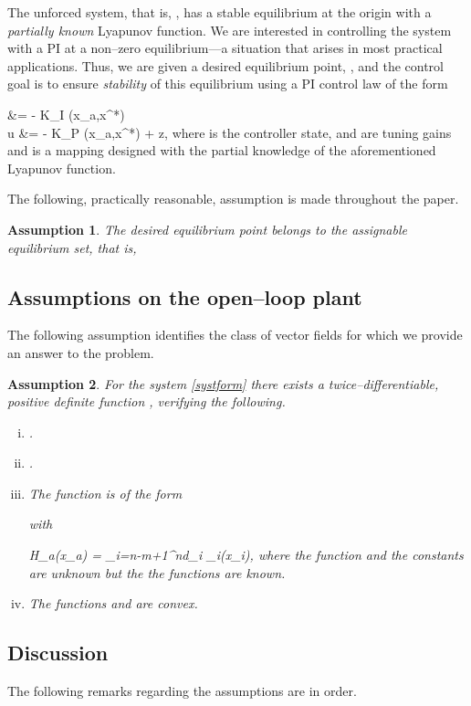 \documentclass[10pt, conference]{ieeeconf}
\newtheorem{assumption}{Assumption}
\def\begequarrs{}
\def\begequ{}
\def\lab{\label}
\begin{document}
The unforced system, that is, ,
has a stable equilibrium at the origin with a {\em partially known} Lyapunov function.  We are interested in controlling the system with a PI at a non--zero equilibrium---a situation that arises in most practical applications.
Thus, we are given a desired equilibrium point, , and the control goal is to ensure {\em stability} of this equilibrium using a PI control law of the form
\begequarrs
{} &= - K_I \psi(x_a,x^*)\\
u &= - K_P  \psi(x_a,x^*) + z,		
\endequarrs
where  is the controller state,  and  are tuning gains and  is a mapping designed with the partial knowledge of the aforementioned Lyapunov function.

The following, practically reasonable, assumption is made throughout the paper.
\begin{assumption} 
\label{as:xstar}
The desired equilibrium point  belongs to the assignable equilibrium set, that is,

\end{assumption}
\subsection{Assumptions on the open--loop plant}
\lab{subsec22}
The following assumption identifies the class of vector fields  for which we provide an answer to the problem.\\

\begin{assumption} 
\label{as:H}
For the system \eqref{systform} there exists a twice--differentiable, positive definite function , verifying the following.\\
\begin{enumerate}[(i)]
	\item .\\
	\item .\\
	\item The function  is of the form

with
\begequ
\lab{h}
H_a(x_a) = \sum_{i=n-m+1}^n{d_i \phi_i(x_i)},
\endequ
where the function  and the constants  are {\em unknown} but the  the functions   are {\em known}.\\
\item The functions  and   are {\em convex}.
\end{enumerate}
\end{assumption}
\subsection{Discussion}
\lab{subsec23}
The following remarks regarding the assumptions are in order.
\end{document}
